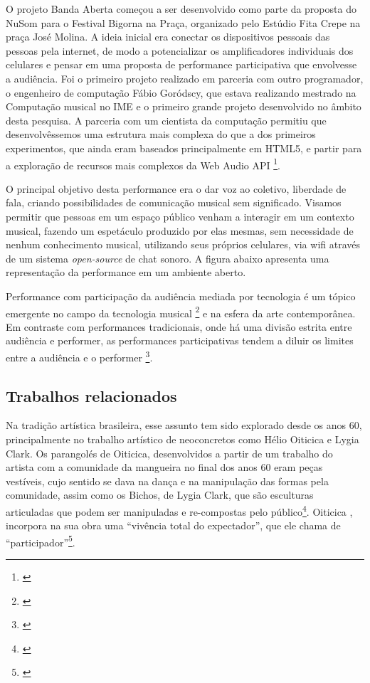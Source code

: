 O projeto Banda Aberta começou a ser desenvolvido como parte da proposta do NuSom para o Festival Bigorna na Praça, organizado pelo Estúdio Fita Crepe na praça José Molina. A ideia inicial era conectar os dispositivos pessoais das pessoas pela internet, de modo a potencializar os amplificadores individuais dos celulares e pensar em uma proposta de performance participativa que envolvesse a audiência. Foi o primeiro projeto realizado em parceria com outro programador, o engenheiro de computação Fábio Goródscy, que estava realizando mestrado na Computação musical no IME e o primeiro grande projeto desenvolvido no âmbito desta pesquisa. A parceria com um cientista da computação permitiu que desenvolvêssemos uma estrutura mais complexa do que a dos primeiros experimentos, que ainda eram baseados principalmente em HTML5, e partir para a exploração de recursos mais complexos da Web Audio API \footnote{\cite{Adenot2015}}.

O principal objetivo desta performance era o dar voz ao coletivo, liberdade de fala, criando possibilidades de comunicação musical sem significado. Visamos permitir que pessoas em um espaço público venham a interagir em um contexto musical, fazendo um espetáculo produzido por elas mesmas, sem necessidade de nenhum conhecimento musical, utilizando seus próprios celulares, via wifi através de um sistema \emph{open-source} de chat sonoro. A figura abaixo apresenta uma representação da performance em um ambiente aberto. 

Performance com participação da audiência mediada por tecnologia é um tópico emergente no campo da tecnologia musical \footnote{\cite{wu2017open}} e na esfera da arte contemporânea. Em contraste com performances tradicionais, onde há uma divisão estrita entre audiência e performer, as performances participativas tendem a diluir os limites entre a audiência e o performer \footnote{\cite{kattwinkel2003audience}}. 

\subsection{Trabalhos relacionados}

Na tradição artística brasileira, esse assunto tem sido explorado desde os anos 60, principalmente no trabalho artístico de neoconcretos como Hélio Oiticica e Lygia Clark. Os parangolés de Oiticica, desenvolvidos a partir de um trabalho do artista com a comunidade da mangueira no final dos anos 60 eram peças vestíveis, cujo sentido se dava na dança e na manipulação das formas pela comunidade, assim como os Bichos, de Lygia Clark, que são esculturas articuladas que podem ser manipuladas e re-compostas pelo público\footnote{\cite{Braga2008}}. Oiticica , incorpora na sua obra uma ``vivência total do expectador'', que ele chama de ``participador''\footnote{\cite{Oiticica1986}}.

